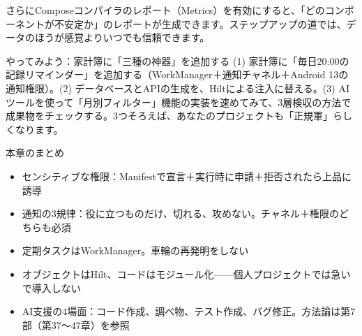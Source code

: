 さらにComposeコンパイラのレポート（Metrics）を有効にすると、「どのコンポーネントが不安定か」のレポートが生成できます。ステップアップの道では、データのほうが感覚よりいつでも信頼できます。

\begin{tcbpractice}{やってみよう：家計簿に「三種の神器」を追加する}
(1) 家計簿に「毎日20:00の記録リマインダー」を追加する（WorkManager＋通知チャネル＋Android 13の通知権限）。(2) データベースとAPIの生成を、Hiltによる注入に替える。(3) AIツールを使って「月別フィルター」機能の実装を速めてみて、3層検収の方法で成果物をチェックする。3つそろえば、あなたのプロジェクトも「正規軍」らしくなります。

\end{tcbpractice}

\begin{tcbsummary}{本章のまとめ}
\begin{itemize}
  \item センシティブな権限：Manifestで宣言＋実行時に申請＋拒否されたら上品に誘導
  \item 通知の3規律：役に立つものだけ、切れる、攻めない。チャネル＋権限のどちらも必須
  \item 定期タスクはWorkManager。車輪の再発明をしない
  \item オブジェクトはHilt、コードはモジュール化——個人プロジェクトでは急いで導入しない
  \item AI支援の4場面：コード作成、調べ物、テスト作成、バグ修正。方法論は第7部（第37〜47章）を参照
\end{itemize}

\end{tcbsummary}
